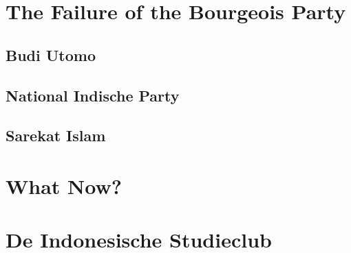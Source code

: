 \section{The Failure of the Bourgeois Party}

\subsection{Budi Utomo}

\subsection{National Indische Party}

\subsection{Sarekat Islam}

\section{What Now?}

\section{De Indonesische Studieclub}